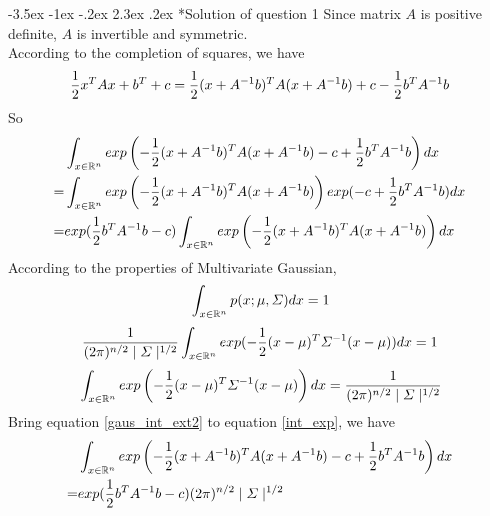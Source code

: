 \documentclass[12pt]{article}
\makeatletter
\renewcommand\section{\@startsection {section}{1}{\z@}%
	{-3.5ex \@plus -1ex \@minus -.2ex}%
	{2.3ex \@plus.2ex}%
	{\normalfont\large\bfseries}}%
\makeatother
\begin{document}
	\section*{Solution of question 1}
	Since matrix $A$ is positive definite, $A$ is invertible and symmetric.\\
	According to the completion of squares, we have
	\begin{equation}{\label{comp_square}}
		\frac{1}{2}x^TAx+b^T+c = \frac{1}{2}(x+A^{-1}b)^TA(x+A^{-1}b)+c-\frac{1}{2}b^TA^{-1}b
	\end{equation}
	So
	\begin{equation}{\label{int_exp}}
	\begin{split}
	\begin{aligned}
		&\int_{x\in\mathbb{R}^n}exp\left(-\frac{1}{2}(x+A^{-1}b)^TA(x+A^{-1}b)-c+\frac{1}{2}b^TA^{-1}b\right)dx\\
		=&\int_{x\in\mathbb{R}^n}exp\left(-\frac{1}{2}(x+A^{-1}b)^TA(x+A^{-1}b)\right)exp(-c+\frac{1}{2}b^TA^{-1}b)dx\\
		=&exp(\frac{1}{2}b^TA^{-1}b-c)\int_{x\in\mathbb{R}^n}exp\left(-\frac{1}{2}(x+A^{-1}b)^TA(x+A^{-1}b)\right)dx
	\end{aligned}
	\end{split}
	\end{equation}
	According to the properties of Multivariate Gaussian,
	\begin{equation}{\label{gaus_int}}
		\int_{x\in\mathbb{R}^n}p(x;\mu,\varSigma)dx = 1
	\end{equation}
	\begin{equation}{\label{gaus_int_ext1}}
		\frac{1}{(2\pi)^{n/2}\mid\varSigma\mid^{1/2}}\int_{x\in\mathbb{R}^n}exp(-\frac{1}{2}(x-\mu)^T\varSigma^{-1}(x-\mu))dx = 1
	\end{equation}
	\begin{equation}{\label{gaus_int_ext2}}
		\int_{x\in\mathbb{R}^n}exp\left(-\frac{1}{2}(x-\mu)^T\varSigma^{-1}(x-\mu)\right)dx = \frac{1}{(2\pi)^{n/2}\mid\varSigma\mid^{1/2}}
	\end{equation}
	\noindent
	Bring equation \ref{gaus_int_ext2} to equation \ref{int_exp}, we have
	\begin{equation}{\label{gaus_int_ext3}}
	\begin{aligned}
		&\int_{x\in\mathbb{R}^n}exp\left(-\frac{1}{2}(x+A^{-1}b)^TA(x+A^{-1}b)-c+\frac{1}{2}b^TA^{-1}b\right)dx\\
		=&exp(\frac{1}{2}b^TA^{-1}b-c)(2\pi)^{n/2}\mid\varSigma\mid^{1/2}
	\end{aligned}
	\end{equation}
	
\end{document}
